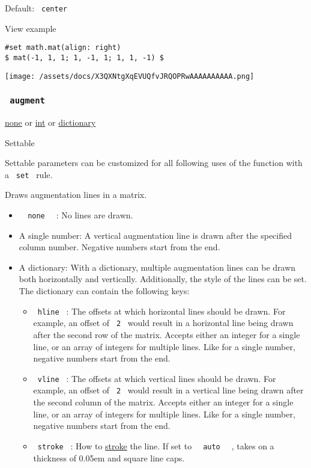 Default: \texttt{\ center\ }


View example

\begin{verbatim}
#set math.mat(align: right)
$ mat(-1, 1, 1; 1, -1, 1; 1, 1, -1) $
\end{verbatim}

\texttt{[image: /assets/docs/X3QXNtgXqEVUQfvJRQOPRwAAAAAAAAAA.png]}

\subsubsection{\texorpdfstring{\texttt{\ augment\ }}{ augment }}\label{parameters-augment}

\href{/docs/reference/foundations/none/}{none} {or}
\href{/docs/reference/foundations/int/}{int} {or}
\href{/docs/reference/foundations/dictionary/}{dictionary}

{{ Settable }}

\label{parameters-augment-settable-tooltip}
Settable parameters can be customized for all following uses of the
function with a \texttt{\ set\ } rule.

Draws augmentation lines in a matrix.

\begin{itemize}
\tightlist
\item
  \texttt{\ }{\texttt{\ none\ }}\texttt{\ } : No lines are drawn.
\item
  A single number: A vertical augmentation line is drawn after the
  specified column number. Negative numbers start from the end.
\item
  A dictionary: With a dictionary, multiple augmentation lines can be
  drawn both horizontally and vertically. Additionally, the style of the
  lines can be set. The dictionary can contain the following keys:

  \begin{itemize}
  \tightlist
  \item
    \texttt{\ hline\ } : The offsets at which horizontal lines should be
    drawn. For example, an offset of \texttt{\ 2\ } would result in a
    horizontal line being drawn after the second row of the matrix.
    Accepts either an integer for a single line, or an array of integers
    for multiple lines. Like for a single number, negative numbers start
    from the end.
  \item
    \texttt{\ vline\ } : The offsets at which vertical lines should be
    drawn. For example, an offset of \texttt{\ 2\ } would result in a
    vertical line being drawn after the second column of the matrix.
    Accepts either an integer for a single line, or an array of integers
    for multiple lines. Like for a single number, negative numbers start
    from the end.
  \item
    \texttt{\ stroke\ } : How to
    \href{/docs/reference/visualize/stroke/}{stroke} the line. If set to
    \texttt{\ }{\texttt{\ auto\ }}\texttt{\ } , takes on a thickness of
    0.05em and square line caps.
  \end{itemize}
\end{itemize}

